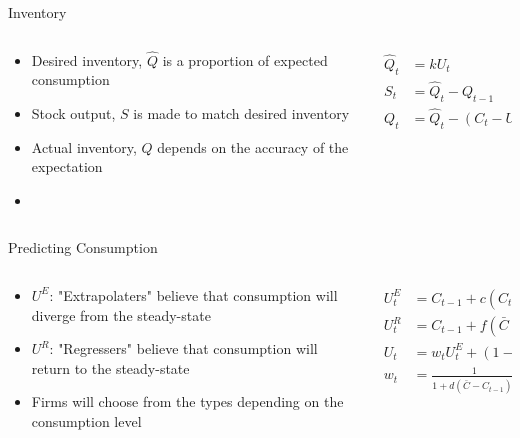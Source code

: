 \documentclass{beamer}
\begin{document}
\begin{frame}{Inventory}
	\begin{columns}
	\begin{column}{0.5\textwidth}
		\begin{itemize}
			\item Desired inventory, $\hat Q$ is a proportion of expected consumption
			\item Stock output, $S$ is made to match desired inventory
			\item Actual inventory, $Q$ depends on the accuracy of the expectation
			\item 
		\end{itemize}
	\end{column}
	\begin{column}{0.5\textwidth}
		\begin{align*}
			\hat Q_t &= kU_t\\
			S_t &= \hat Q_t - Q_{t-1}\\
			Q_t &= \hat Q_t - (C_t-U_t)
		\end{align*}
	\end{column}
	\end{columns}
\end{frame}

\begin{frame}{Predicting Consumption}
	\begin{columns}
	\begin{column}{0.5\textwidth}
		\begin{itemize}
			\item $U^E$: "Extrapolaters" believe that consumption will diverge from the steady-state
			\item $U^R$: "Regressers" believe that consumption will return to the steady-state
			\item Firms will choose from the types depending on the consumption level
		\end{itemize}
	\end{column}
	\begin{column}{0.5\textwidth}
		\begin{align*}
			U_t^E &= C_{t-1} + c(C_{t-1}-\bar C)\\
			U_t^R &= C_{t-1} + f(\bar C-C_{t-1})\\
			U_t &= w_tU_t^E+(1-w_t)U_t^R\\
			w_t &= \frac{1}{1+d(\bar C-C_{t-1})^2}
		\end{align*}
	\end{column}
	\end{columns}
\end{frame}
\end{document}
